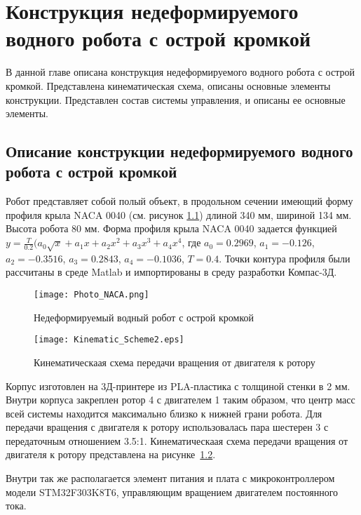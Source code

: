 \chapter{Конструкция недеформируемого водного робота с острой кромкой}\label{ch:ch5}

В данной главе описана конструкция недеформируемого водного робота с острой кромкой. Представлена кинематическая схема, описаны основные элементы конструкции. Представлен состав системы управления, и описаны ее основные элементы.

\section{Описание конструкции недеформируемого водного робота с острой кромкой}

Робот представляет собой полый объект, в продольном сечении имеющий форму профиля крыла NACA 0040 (см. рисунок \ref{Photo_NACA}) длиной 340 мм, шириной 134 мм. Высота робота 80 мм. Форма профиля крыла NACA 0040 задается функцией 
$ y = \frac{T}{0.2}(a_0\sqrt{x} + a_1x + a_2x^2 + a_3x^3 + a_4x^4 $, где $a_0=0.2969$, $a_1=-0.126$, $a_2=-0.3516$, $a_3=0.2843$, $a_4=-0.1036$, $T=0.4$. Точки контура профиля были рассчитаны в среде Matlab и импортированы в среду разработки Компас-3Д.	

\begin{figure}[h]
	\centering
	\texttt{[image: Photo\_NACA.png]}%
	\caption{Недеформируемый водный робот с острой кромкой}
	\label{Photo_NACA}
\end{figure}

\begin{figure}[h]
	\centering
	\texttt{[image: Kinematic\_Scheme2.eps]}%
	\caption{Кинематическаая схема передачи вращения от двигателя к ротору}
	\label{kinemSchemeNACA}
\end{figure}

Корпус изготовлен на 3Д-принтере из PLA-пластика с толщиной стенки в 2 мм. Внутри корпуса закреплен ротор 4 с двигателем 1 таким образом, что центр масс всей системы находится максимально близко к нижней грани робота. Для передачи вращения с двигателя к ротору использовалась пара шестерен 3 с передаточным отношением 3.5:1. Кинематическаая схема передачи вращения от двигателя к ротору представлена на рисунке~\ref{kinemSchemeNACA}.



Внутри так же располагается элемент питания и плата с микроконтроллером модели STM32F303K8T6, управляющим вращением двигателем постоянного тока. 

